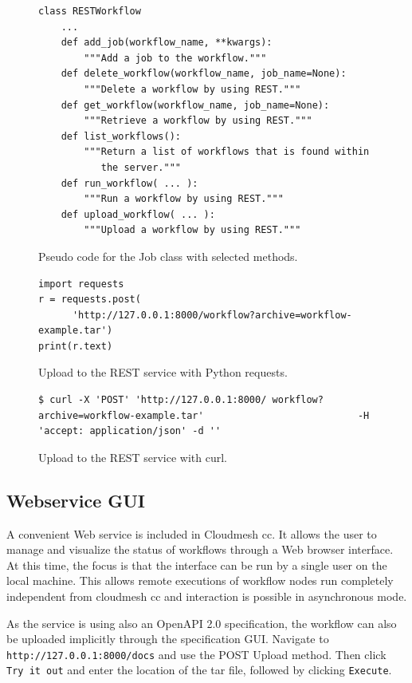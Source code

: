 \documentclass[sigplan,screen]{acmart}
\begin{document}
\begin{figure}[t]
\begin{verbatim}
class RESTWorkflow
    ...
    def add_job(workflow_name, **kwargs):
        """Add a job to the workflow."""
    def delete_workflow(workflow_name, job_name=None):
        """Delete a workflow by using REST."""
    def get_workflow(workflow_name, job_name=None):
        """Retrieve a workflow by using REST."""
    def list_workflows():
        """Return a list of workflows that is found within
           the server."""
    def run_workflow( ... ):
        """Run a workflow by using REST."""
    def upload_workflow( ... ):
        """Upload a workflow by using REST."""
\end{verbatim}
\caption{Pseudo code for the Job class with selected methods.}
\label{fig:code-workflow-rest-commandline}

\bigskip

\begin{verbatim}
import requests
r = requests.post(
      'http://127.0.0.1:8000/workflow?archive=workflow-example.tar')
print(r.text)
\end{verbatim}
\caption{Upload to the REST service with Python requests.}
\label{fig:code-workflow-requests}

\bigskip

\begin{verbatim}
$ curl -X 'POST' 'http://127.0.0.1:8000/ workflow?archive=workflow-example.tar'                           -H 'accept: application/json' -d ''
\end{verbatim}
\caption{Upload to the REST service with curl.}
\label{fig:code-workflow-curl}

\end{figure}


\subsection{Webservice GUI}

A convenient Web service is included in Cloudmesh cc. It allows the
user to manage and visualize the status of workflows through a Web
browser interface. At this time, the focus is that the interface can
be run by a single user on the local machine. This allows remote
executions of workflow nodes run completely independent from cloudmesh
cc and interaction is possible in asynchronous mode.

As the service is using also an OpenAPI 2.0 specification, the
workflow can also be uploaded implicitly through the specification
GUI. Navigate to {\scriptsize \texttt{http://127.0.0.1:8000/docs}} and
use the POST Upload method. Then click {\scriptsize \texttt{Try\ it\ out}}
and enter the location of the tar file, followed by clicking
{\scriptsize \texttt{Execute}}.
\end{document}
